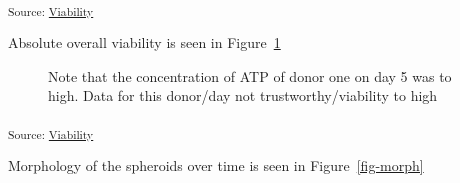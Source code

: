 \documentclass[
  letterpaper,
  DIV=11,
  numbers=noendperiod,
  oneside]{scrartcl}
\begin{document}
\textsubscript{Source:
\href{https://andreasludvig.github.io/manuscript_one/notebooks/viability/Viability-preview.html\#cell-fig-donor-viabilities}{Viability}}

Absolute overall viability is seen in
Figure~\ref{fig-viability-absolute-overall}

\begin{figure}[H]


\caption{\label{fig-viability-absolute-overall}Note that the
concentration of ATP of donor one on day 5 was to high. Data for this
donor/day not trustworthy/viability to high}

\end{figure}%

\textsubscript{Source:
\href{https://andreasludvig.github.io/manuscript_one/notebooks/viability/Viability-preview.html\#cell-fig-viability-absolute-overall}{Viability}}

Morphology of the spheroids over time is seen in Figure~\ref{fig-morph}
\end{document}
